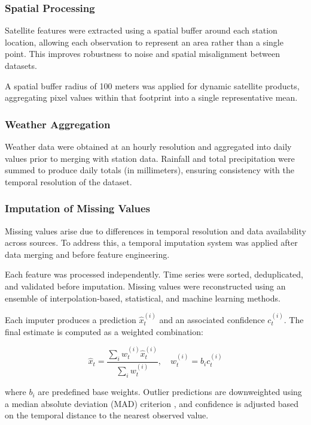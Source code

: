 \subsubsection*{Spatial Processing}
Satellite features were extracted using a spatial buffer around each station location, allowing each observation to represent an area rather than a single point. This improves robustness to noise and spatial misalignment between datasets.


A spatial buffer radius of 100 meters was applied for dynamic satellite products, aggregating pixel values within that footprint into a single representative mean.

\subsubsection*{Weather Aggregation}
Weather data were obtained at an hourly resolution and aggregated into daily values prior to merging with station data. Rainfall and total precipitation were summed to produce daily totals (in millimeters), ensuring consistency with the temporal resolution of the dataset.

\subsubsection*{Imputation of Missing Values}
Missing values arise due to differences in temporal resolution and data availability across sources. To address this, a temporal imputation system was applied after data merging and before feature engineering.

Each feature was processed independently. Time series were sorted, deduplicated, and validated before imputation. Missing values were reconstructed using an ensemble of interpolation-based, statistical, and machine learning methods.

Each imputer produces a prediction $\hat{x}_t^{(i)}$ and an associated confidence $c_t^{(i)}$. The final estimate is computed as a weighted combination:

\begin{equation}
\hat{x}_t = \frac{\sum_i w_t^{(i)} \hat{x}_t^{(i)}}{\sum_i w_t^{(i)}},
\quad w_t^{(i)} = b_i c_t^{(i)}
\end{equation}

where $b_i$ are predefined base weights. Outlier predictions are downweighted using a median absolute deviation (MAD) criterion \cite{hampel1974}, and confidence is adjusted based on the temporal distance to the nearest observed value.

